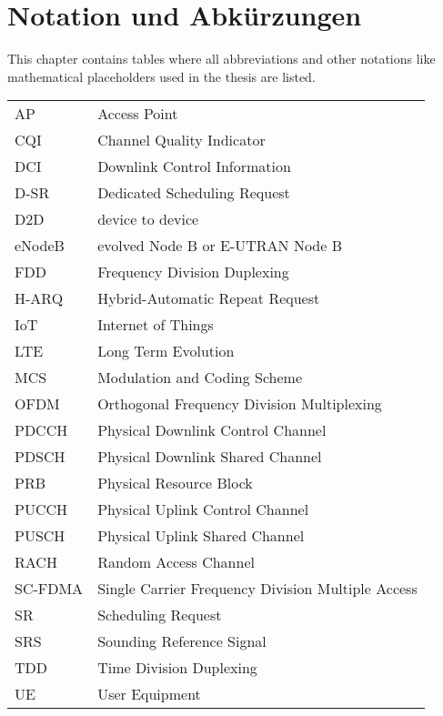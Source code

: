 \chapter{Notation und Abkürzungen}
This chapter contains tables where all abbreviations and other notations like mathematical
placeholders used in the thesis are listed.
\begin{table}[h]
\begin{tabular}{ll}
AP & Access Point\\
CQI & Channel Quality Indicator\\
DCI & Downlink Control Information\\
D-SR & Dedicated Scheduling Request\\
D2D & device to device\\
eNodeB & evolved Node B or E-UTRAN Node B\\
FDD & Frequency Division Duplexing\\
H-ARQ & Hybrid-Automatic Repeat Request\\
IoT & Internet of Things\\
LTE & Long Term Evolution\\
MCS & Modulation and Coding Scheme\\
OFDM & Orthogonal Frequency Division Multiplexing\\
PDCCH & Physical Downlink Control Channel\\
PDSCH & Physical Downlink Shared Channel\\
PRB & Physical Resource Block\\
PUCCH & Physical Uplink Control Channel\\
PUSCH & Physical Uplink Shared Channel\\
RACH & Random Access Channel\\
SC-FDMA & Single Carrier Frequency Division Multiple Access\\
SR & Scheduling Request\\
SRS & Sounding Reference Signal\\
TDD & Time Division Duplexing\\
UE & User Equipment\\
\end{tabular}
\end{table}

